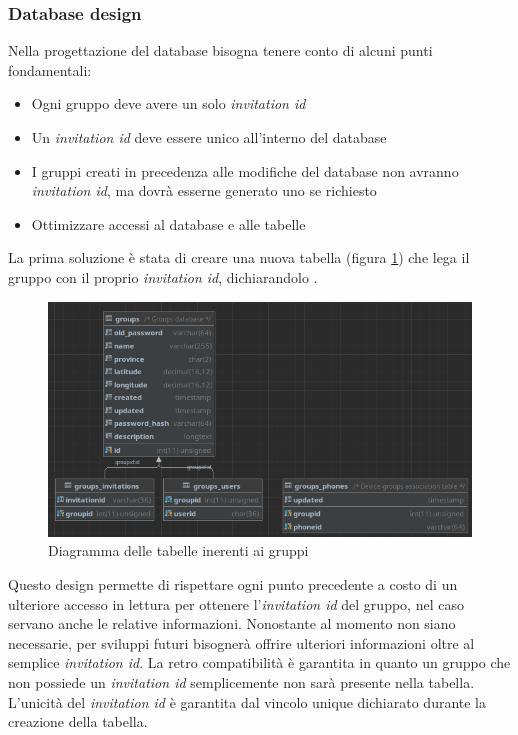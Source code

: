 \documentclass[main.tex]{subfiles}
\begin{document}
\subsubsection{Database design}
Nella progettazione del database bisogna tenere conto di alcuni punti fondamentali:
\begin{itemize}
    \item Ogni gruppo deve avere un solo \emph{invitation id}
    \item Un \emph{invitation id} deve essere unico all'interno del database
    \item I gruppi creati in precedenza alle modifiche del database non avranno \emph{invitation id}, ma dovrà esserne generato uno se richiesto
    \item Ottimizzare accessi al database e alle tabelle
\end{itemize}
La prima soluzione è stata di creare una nuova tabella  (figura \ref{fig:invitation-first}) che lega il gruppo con il proprio \emph{invitation id}, dichiarandolo .
\begin{figure}[H]
    \centering
    \includegraphics[width=1\linewidth]{img/add-link-task/invitation-first.png}
    \caption{Diagramma delle tabelle inerenti ai gruppi}
    \label{fig:invitation-first}
\end{figure}
Questo design permette di rispettare ogni punto precedente a costo di un ulteriore accesso in lettura per ottenere l'\emph{invitation id} del gruppo, nel caso servano anche le relative informazioni. Nonostante al momento non siano necessarie, per sviluppi futuri bisognerà offrire ulteriori informazioni oltre al semplice \emph{invitation id}. La retro compatibilità è garantita in quanto un gruppo che non possiede un \emph{invitation id} semplicemente non sarà presente nella tabella. L'unicità del \emph{invitation id} è garantita dal vincolo unique dichiarato durante la creazione della tabella.
\end{document}
